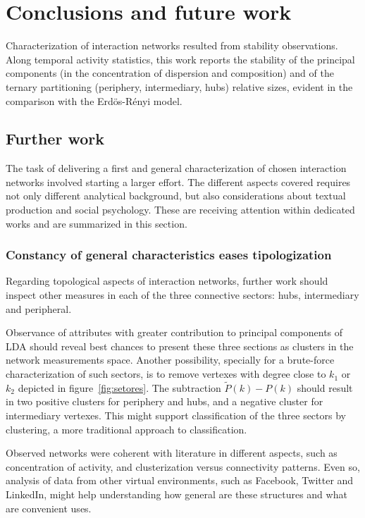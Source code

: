 \documentclass[%
 aip,
 jmp,%
 amsmath,amssymb,
 reprint,%
]{revtex4-1}
\begin{document}
\section{Conclusions and future work}
Characterization of interaction networks resulted from stability observations. Along temporal activity statistics, this work reports the stability of the principal components (in the concentration of dispersion and composition) and of the ternary partitioning (periphery, intermediary, hubs) relative sizes, evident in the comparison with the Erd\"os-R\'enyi model.


    \subsection{Further work}
The task of delivering a first and general characterization of chosen interaction networks involved starting a larger effort. The different aspects covered requires not only different analytical background, but also considerations about textual production and social psychology. These are receiving attention within dedicated works and are summarized in this section.

        \subsubsection{Constancy of general characteristics eases tipologization}

Regarding topological aspects of interaction networks, further work should inspect other measures in each of the three connective sectors: hubs, intermediary and peripheral.

 Observance of attributes with greater contribution to principal components of LDA should reveal best chances to present these three sections as clusters in the network measurements space. Another possibility, specially for a brute-force characterization of such sectors, is to remove vertexes with degree close to $k_1$ or $k_2$ depicted in figure~\ref{fig:setores}. The subtraction $\widetilde{P}(k)-P(k)$ should result in two positive clusters for periphery and hubs, and a negative cluster for intermediary vertexes. This might support classification of the three sectors by clustering, a more traditional approach to classification.

Observed networks were coherent with literature in different aspects, such as concentration of activity, and clusterization versus connectivity patterns. Even so, analysis of data from other virtual environments, such as Facebook, Twitter and LinkedIn, might help understanding how general are these structures and what are convenient uses.
\end{document}
